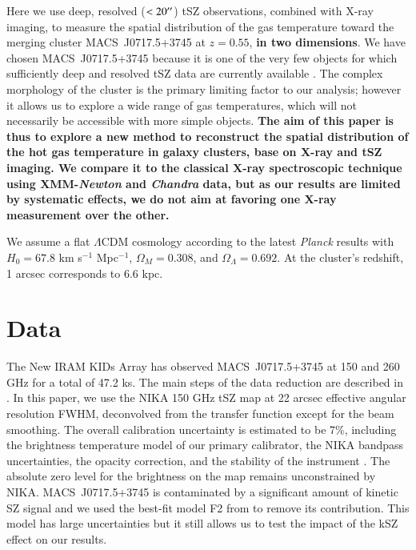 \documentclass[twocolumn,traditabstract]{aa}
\begin{document}
Here we use deep, resolved ($< 20\hbox{$^{\prime\prime}$}$) tSZ observations, combined with X-ray imaging, to measure the spatial distribution of the gas temperature toward the merging cluster \mbox{MACS~J0717.5+3745} at $z=0.55$, {\bf in two dimensions}. We have chosen \mbox{MACS~J0717.5+3745} because it is one of the very few objects for which sufficiently deep and resolved tSZ data are currently available \citep{Adam2016b}. The complex morphology of the cluster is the primary limiting factor to our analysis; however it allows us to explore a wide range of gas temperatures, which will not necessarily be accessible with more simple objects. {\bf The aim of this paper is thus to explore a new method to reconstruct the spatial distribution of the hot gas temperature in galaxy clusters, base on X-ray and tSZ imaging. We compare it to the classical X-ray spectroscopic technique using XMM-\textit{Newton} and \textit{Chandra} data, but as our results are limited by systematic effects, we do not aim at favoring one X-ray measurement over the other.}

We assume a flat $\Lambda$CDM cosmology according to the latest {\it Planck} results \citep{Planck2015XIII} with $H_0 = 67.8$ km s$^{-1}$ Mpc$^{-1}$, $\Omega_M = 0.308$, and $\Omega_{\Lambda} = 0.692$. At the cluster's redshift, 1 arcsec corresponds to 6.6 kpc.

\section{Data}\label{sec:data}
The New IRAM KIDs Array \citep[NIKA, see][]{Monfardini2011,Calvo2013,Adam2014,Catalano2014} has observed \mbox{MACS~J0717.5+3745} at 150 and 260 GHz for a total of 47.2 ks. The main steps of the data reduction are described in \cite{Adam2015,Adam2016a,Adam2016b,Ruppin2016}. In this paper, we use the NIKA 150 GHz tSZ map at 22 arcsec effective angular resolution FWHM, deconvolved from the transfer function except for the beam smoothing. The overall calibration uncertainty is estimated to be 7\%, including the brightness temperature model of our primary calibrator, the NIKA bandpass uncertainties, the opacity correction, and the stability of the instrument \citep{Catalano2014}. The absolute zero level for the brightness on the map remains unconstrained by NIKA. \mbox{MACS~J0717.5+3745} is contaminated by a significant amount of kinetic SZ \citep[kSZ,][]{Sunyaev1980} signal and we used the best-fit model F2 from \cite{Adam2016b} to remove its contribution. This model has large uncertainties but it still allows us to test the impact of the kSZ effect on our results.
\end{document}
